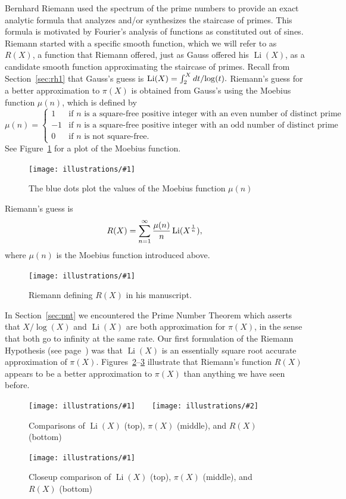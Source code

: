 \documentclass[11pt]{article}
\DeclareMathOperator{\Li}{Li}
\newcommand{\ill}[3]{ 
   \begin{figure}[H]
   \begin{center}
   \texttt{[image: illustrations/\#1]}
   \caption{#3}
   \end{center}
    \end{figure}
}
\newcommand{\illtwo}[4]{ 
   \begin{figure}[H]
   \begin{center}
   \texttt{[image: illustrations/\#1]}$\qquad$\texttt{[image: illustrations/\#2]}
   \caption{#4}
    \end{center}
    \end{figure}
}
\theoremstyle{plain}
\theoremstyle{definition}
\numberwithin{equation}{section}
\numberwithin{figure}{section}
\numberwithin{table}{section}
\begin{document}
Bernhard Riemann used the spectrum of the prime numbers to provide an 
exact analytic formula that analyzes and/or synthesizes the staircase of primes.  This formula is
motivated by Fourier's analysis of functions as constituted out of
sines.
Riemann started with a specific smooth function, which we will refer to
as $R(X)$, a function that Riemann offered, just as Gauss offered his
$\Li(X)$, as a candidate smooth function approximating the staircase of
primes.  
Recall from Section~\ref{sec:rh1} that Gauss's guess is $\Li(X)=
    \int_2^{X}dt/{\rm log}(t).$ 
Riemann's guess for a better approximation to $\pi(X)$ is obtained
from Gauss's using the Moebius function $\mu(n)$, which is defined by
$$
 \mu(n) = \begin{cases} 
    1 & 
       \mbox{if $n$ is a square-free positive integer with an even number of distinct prime factors}\\
    -1& \mbox{if $n$ is a square-free positive integer with an odd number of distinct prime factors}\\ 
    0 & \mbox{if $n$ is not square-free.} 
 \end{cases} 
 $$
 See Figure~\ref{fig:moebius} for a plot of the Moebius function. 
 
\ill{moebius}{1}{The blue dots plot the values of the Moebius function $\mu(n)$\label{fig:moebius}}


Riemann's guess is
$$
R(X) = \sum_{n=1}^{\infty}{\mu(n)\over n} \Li(X^{1\over n}),
$$  
where $\mu(n)$ is the Moebius function introduced above. 

\ill{riemann_RX}{0.8}{Riemann defining $R(X)$ in his manuscript.}

In Section~\ref{sec:pnt} we encountered the Prime Number Theorem which 
asserts that $X/\log(X)$ and $\Li(X)$ are both approximation for $\pi(X)$, 
in the sense that both go to infinity at the same rate. 
Our first formulation of the Riemann Hypothesis (see page~\pageref{rh:first})
was that $\Li(X)$ is an essentially square root accurate approximation of $\pi(X)$. 
Figures~\ref{fig:guess100}--\ref{fig:guess10000} illustrate that Riemann's function $R(X)$ appears to be a better
approximation to $\pi(X)$ than anything we have seen before. 

\illtwo{pi_riemann_gauss_100}{pi_riemann_gauss_1000}{0.5}{Comparisons of $\Li(X)$ (top), $\pi(X)$ (middle), and $R(X)$ (bottom)\label{fig:guess100}}

\ill{pi_riemann_gauss_10000-11000}{0.5}{Closeup comparison of  $\Li(X)$ (top), $\pi(X)$ (middle), and $R(X)$ (bottom)\label{fig:guess10000}}
\end{document}
